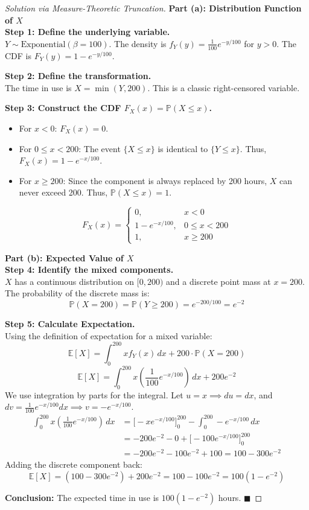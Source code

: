 \documentclass[11pt, a4paper]{article}
\theoremstyle{definition}
\theoremstyle{remark}
\newcommand{\E}{\mathbb{E}}
\newcommand{\Prob}{\mathbb{P}}
\begin{document}
\begin{proof}[Solution via Measure-Theoretic Truncation]
\textbf{Part (a): Distribution Function of $X$} \\
\textbf{Step 1: Define the underlying variable.} \\
$Y \sim \text{Exponential}(\beta = 100)$. The density is $f_Y(y) = \frac{1}{100}e^{-y/100}$ for $y > 0$. The CDF is $F_Y(y) = 1 - e^{-y/100}$.

\textbf{Step 2: Define the transformation.} \\
The time in use is $X = \min(Y, 200)$. This is a classic right-censored variable.

\textbf{Step 3: Construct the CDF $F_X(x) = \Prob(X \le x)$.} \\
\begin{itemize}
    \item For $x < 0$: $F_X(x) = 0$.
    \item For $0 \le x < 200$: The event $\{X \le x\}$ is identical to $\{Y \le x\}$. Thus, $F_X(x) = 1 - e^{-x/100}$.
    \item For $x \ge 200$: Since the component is always replaced by 200 hours, $X$ can never exceed 200. Thus, $\Prob(X \le x) = 1$.
\end{itemize}
\[ F_X(x) = \begin{cases} 0, & x < 0 \\ 1 - e^{-x/100}, & 0 \le x < 200 \\ 1, & x \ge 200 \end{cases} \]

\textbf{Part (b): Expected Value of $X$} \\
\textbf{Step 4: Identify the mixed components.} \\
$X$ has a continuous distribution on $[0, 200)$ and a discrete point mass at $x = 200$. The probability of the discrete mass is:
\[ \Prob(X = 200) = \Prob(Y \ge 200) = e^{-200/100} = e^{-2} \]

\textbf{Step 5: Calculate Expectation.} \\
Using the definition of expectation for a mixed variable:
\[ \E[X] = \int_{0}^{200} x f_Y(x) \, dx + 200 \cdot \Prob(X = 200) \]
\[ \E[X] = \int_{0}^{200} x \left(\frac{1}{100}e^{-x/100}\right) \, dx + 200e^{-2} \]
We use integration by parts for the integral. Let $u = x \implies du = dx$, and $dv = \frac{1}{100}e^{-x/100}dx \implies v = -e^{-x/100}$.
\begin{align*}
\int_{0}^{200} x \left(\frac{1}{100}e^{-x/100}\right) \, dx &= \Big[ -x e^{-x/100} \Big]_{0}^{200} - \int_{0}^{200} -e^{-x/100} \, dx \\
&= -200e^{-2} - 0 + \Big[ -100e^{-x/100} \Big]_{0}^{200} \\
&= -200e^{-2} - 100e^{-2} + 100 = 100 - 300e^{-2}
\end{align*}
Adding the discrete component back:
\[ \E[X] = (100 - 300e^{-2}) + 200e^{-2} = 100 - 100e^{-2} = 100(1 - e^{-2}) \]

\textbf{Conclusion:} The expected time in use is $100(1 - e^{-2})$ hours. $\blacksquare$
\end{proof}
\end{document}

